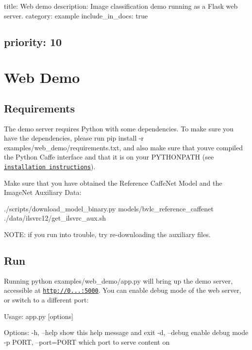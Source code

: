 

 title\+: Web demo description\+: Image classification demo running as a Flask web server. category\+: example include\+\_\+in\+\_\+docs\+: true \subsection*{priority\+: 10 }

\section*{Web Demo}

\subsection*{Requirements}

The demo server requires Python with some dependencies. To make sure you have the dependencies, please run {\ttfamily pip install -\/r examples/web\+\_\+demo/requirements.\+txt}, and also make sure that you\textquotesingle{}ve compiled the Python Caffe interface and that it is on your {\ttfamily P\+Y\+T\+H\+O\+N\+P\+A\+TH} (see \href{http://caffe.berkeleyvision.org/installation.html}{\tt installation instructions}).

Make sure that you have obtained the Reference Caffe\+Net Model and the Image\+Net Auxiliary Data\+: \begin{DoxyVerb}./scripts/download_model_binary.py models/bvlc_reference_caffenet
./data/ilsvrc12/get_ilsvrc_aux.sh
\end{DoxyVerb}


N\+O\+TE\+: if you run into trouble, try re-\/downloading the auxiliary files.

\subsection*{Run}

Running {\ttfamily python examples/web\+\_\+demo/app.\+py} will bring up the demo server, accessible at {\ttfamily \href{http://0.0.0.0:5000}{\tt http\+://0...\+:5000}}. You can enable debug mode of the web server, or switch to a different port\+: \begin{DoxyVerb}%
Usage: app.py [options]

Options:
  -h, --help            show this help message and exit
  -d, --debug           enable debug mode
  -p PORT, --port=PORT  which port to serve content on
\end{DoxyVerb}


